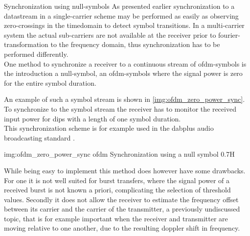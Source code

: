 \begin{subchapter}{Synchronization using null-symbols}
  As presented earlier synchronization to a datastream in a single-carrier scheme
  may be performed as easily as observing zero-crossings in the
  timedomain to detect symbol transitions.
  In a multi-carrier system the actual sub-carriers are not available
  at the receiver prior to fourier-transformation to the
  frequency domain, thus synchronization has to be performed
  differently. \\

  One method to synchronize a receiver to a continuous stream
  of \gls{ofdm}-symbols is the introduction a null-symbol,
  an \gls{ofdm}-symbols where the signal power is zero for the
  entire symbol duration.

  An example of such a symbol stream is shown in
  \autoref{img:ofdm_zero_power_sync}.
  To synchronize to the symbol stream the receiver has
  to monitor the received input power for dips with a
  length of one symbol duration. \\

  This synchronization scheme is for example used in
  the \acrshort{dabplus} audio broadcasting standard \cite{dabstandard}.

               {img:ofdm_zero_power_sync}
               {\acrshort{ofdm} Synchronization using a null symbol}
               {0.7}{H}

  While being easy to implement this method does however
  have some drawbacks.
  For one it is not well suited for burst transfers,
  where the signal power of a received burst is not
  known a priori, complicating the selection of threshold
  values.
  Secondly it does not allow the receiver to estimate the
  frequency offset between its carrier and the carrier of the
  transmitter, a previously undiscussed topic, that is
  for example important when the receiver and transmitter
  are moving relative to one another, due to the resulting doppler
  shift in frequency.
\end{subchapter}

